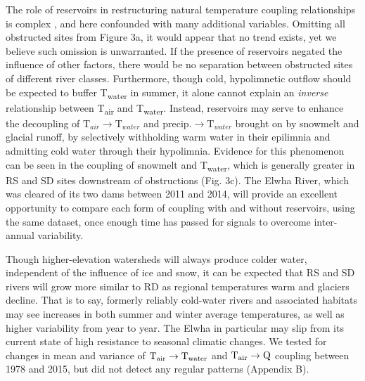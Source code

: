 \documentclass[notitlepage]{article}
\begin{document}
The role of reservoirs in restructuring natural temperature coupling relationships is complex \citep{damsComplex,WarmingPostDam}, and here confounded with many additional variables. Omitting all obstructed sites from Figure 3a, it would appear that no trend exists, yet we believe such omission is unwarranted. If the presence of reservoirs negated the influence of other factors, there would be no separation between obstructed sites of different river classes. Furthermore, though cold, hypolimnetic outflow should be expected to buffer T\textsubscript{water} in summer, it alone cannot explain an {\it inverse} relationship between T\textsubscript{air} and T\textsubscript{water}. Instead, reservoirs may serve to enhance the decoupling of $\textrm{T}_{air}\rightarrow \textrm{T}_{water}$ and $\textrm{precip.}\rightarrow \textrm{T}_{water}$ brought on by snowmelt and glacial runoff, by selectively withholding warm water in their epilimnia and admitting cold water through their hypolimnia. Evidence for this phenomenon can be seen in the coupling of snowmelt and T\textsubscript{water}, which is generally greater in RS and SD sites downstream of obstructions (Fig. 3c). The Elwha River, which was cleared of its two dams between 2011 and 2014, will provide an excellent opportunity to compare each form of coupling with and without reservoirs, using the same dataset, once enough time has passed for signals to overcome inter-annual variability.

Though higher-elevation watersheds will always produce colder water, independent of the influence of ice and snow, it can be expected that RS and SD rivers will grow more similar to RD as regional temperatures warm and glaciers decline. That is to say, formerly reliably cold-water rivers and associated habitats may see increases in both summer and winter average temperatures, as well as higher variability from year to year. The Elwha in particular may slip from its current state of high resistance to seasonal climatic changes. We tested for changes in mean and variance of $\textrm{T}\textsubscript{air}\rightarrow \textrm{T}\textsubscript{water}$ and $\textrm{T}\textsubscript{air}\rightarrow \textrm{Q}$ coupling between 1978 and 2015, but did not detect any regular patterns (Appendix B).
\end{document}

